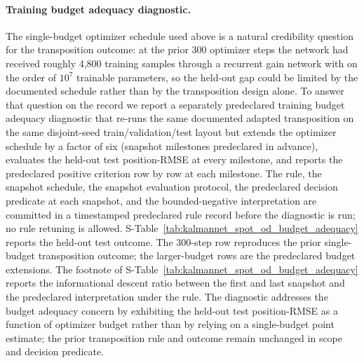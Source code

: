 \documentclass{article}
\begin{document}
\paragraph{Training budget adequacy diagnostic.}
The single-budget optimizer schedule used above is a natural credibility question for the transposition outcome: at the prior 300 optimizer steps the network had received roughly 4{,}800 training samples through a recurrent gain network with on the order of $10^{7}$ trainable parameters, so the held-out gap could be limited by the documented schedule rather than by the transposition design alone. To answer that question on the record we report a separately predeclared training budget adequacy diagnostic that re-runs the same documented adapted transposition on the same disjoint-seed train/validation/test layout but extends the optimizer schedule by a factor of six (snapshot milestones predeclared in advance), evaluates the held-out test position-RMSE at every milestone, and reports the predeclared positive criterion row by row at each milestone. The rule, the snapshot schedule, the snapshot evaluation protocol, the predeclared decision predicate at each snapshot, and the bounded-negative interpretation are committed in a timestamped predeclared rule record before the diagnostic is run; no rule retuning is allowed. S-Table~\ref{tab:kalmannet_spot_od_budget_adequacy} reports the held-out test outcome. The 300-step row reproduces the prior single-budget transposition outcome; the larger-budget rows are the predeclared budget extensions. The footnote of S-Table~\ref{tab:kalmannet_spot_od_budget_adequacy} reports the informational descent ratio between the first and last snapshot and the predeclared interpretation under the rule. The diagnostic addresses the budget adequacy concern by exhibiting the held-out test position-RMSE as a function of optimizer budget rather than by relying on a single-budget point estimate; the prior transposition rule and outcome remain unchanged in scope and decision predicate.
\end{document}
